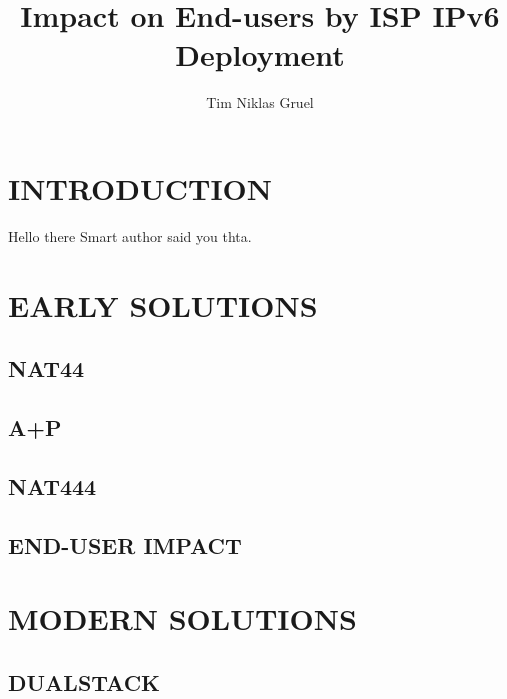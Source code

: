\documentclass[format=sigconf, natbib=true, nonacm=true]{acmart}
\begin{document}
    \title{Impact on End-users by ISP IPv6 Deployment}

    \author{Tim Niklas Gruel}

    

    \begin{abstract}
        \lipsum[2]
    \end{abstract}


    \maketitle

    \section{INTRODUCTION}
    \lipsum[1-10]
    Hello there Smart author said you\cite{7119767} thta.

    \section{EARLY SOLUTIONS}
    \lipsum[11]
    \subsection{NAT44}
    \lipsum[12-15]
    \subsection{A+P}
    \lipsum[14-16]
    \subsection{NAT444}
    \lipsum[16-18]
    \subsection*{END-USER IMPACT}
    \lipsum[18-22]

    \section{MODERN SOLUTIONS}
    \lipsum[21]
    \subsection{DUALSTACK}
    \lipsum[22-25]
\end{document}
